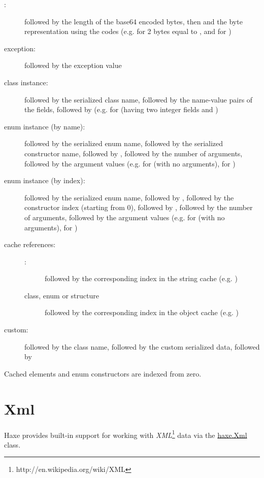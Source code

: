 \begin{description}
	\item[:]  followed by the length of the base64 encoded bytes, then \expr{:} and the byte representation using the codes  (e.g.  for 2 bytes equal to , and  for )
	\item[exception:]  followed by the exception value
	\item[class instance:]  followed by the serialized class name, followed by the name-value pairs of the fields, followed by  (e.g.  for  (having two integer fields  and )
        \item[enum instance (by name):]  followed by the serialized enum name, followed by the serialized constructor name, followed by \expr{:}, followed by the number of arguments, followed by the argument values (e.g.  for  (with no arguments),  for )
	\item[enum instance (by index):]  followed by the serialized enum name, followed by \expr{:}, followed by the constructor index (starting from 0), followed by \expr{:}, followed by the number of arguments, followed by the argument values (e.g.  for  (with no arguments),  for )
	\item[cache references:] \mbox{}
		\begin{description}
			\item[:]  followed by the corresponding index in the string cache (e.g. )
			\item[class, enum or structure]  followed by the corresponding index in the object cache (e.g. )
		\end{description}
	\item[custom:]  followed by the class name, followed by the custom serialized data, followed by 
\end{description}

\noindent Cached elements and enum constructors are indexed from zero.

\section{Xml}
\label{std-Xml}

Haxe provides built-in support for working with \emph{XML}\footnote{http://en.wikipedia.org/wiki/XML} data via the \href{https://api.haxe.org/Xml.html}{haxe.Xml} class. 

